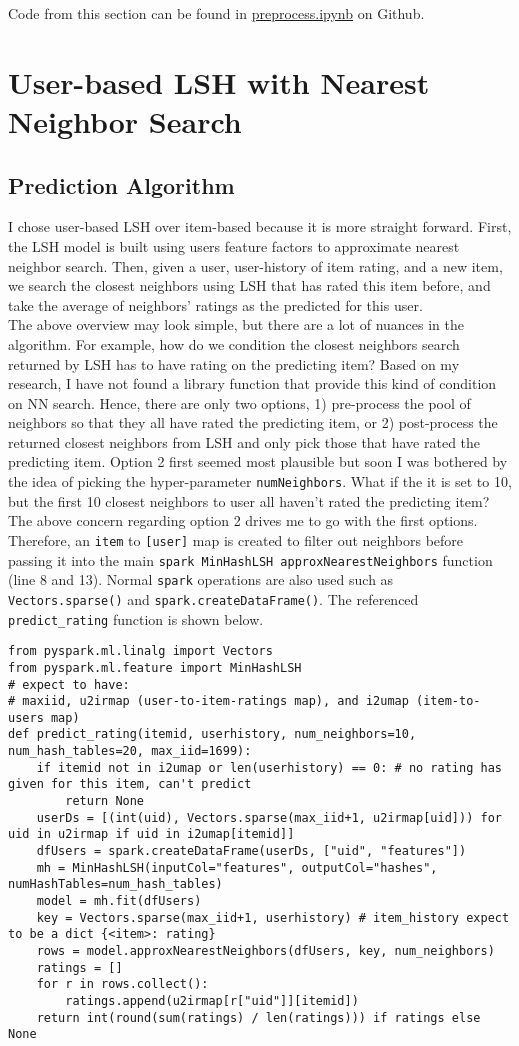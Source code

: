 \documentclass{scrartcl}
\begin{document}
Code from this section can be found in \href{pre}{preprocess.ipynb} on Github. \\
\section{User-based LSH with Nearest Neighbor Search}
\subsection{Prediction Algorithm}
I chose user-based LSH over item-based because it is more straight forward. First, the LSH model is built using users feature factors to approximate nearest neighbor search. Then, given a user, user-history of item rating, and a new item, we search the closest neighbors using LSH that has rated this item before, and take the average of neighbors' ratings as the predicted for this user. \\
The above overview may look simple, but there are a lot of nuances in the algorithm. For example,
how do we condition the closest neighbors search returned by LSH has to have rating on the predicting item? Based on my research, I have not found a library function that provide this kind of condition on NN search. Hence, there are only two options, 1) pre-process the pool of neighbors so that they all have rated the predicting item, or 2) post-process the returned closest neighbors from LSH and only pick those that have rated the predicting item. Option 2 first seemed most plausible but soon I was bothered by the idea of picking the hyper-parameter \texttt{numNeighbors}. What if the it is set to 10, but the first 10 closest neighbors to user all haven't rated the predicting item? \\
The above concern regarding option 2 drives me to go with the first options. Therefore, an \texttt{item} to \texttt{[user]} map is created to filter out neighbors before passing it into the main \texttt{spark MinHashLSH approxNearestNeighbors} function (line 8 and 13). Normal \texttt{spark} operations are also used such as \texttt{Vectors.sparse()} and \texttt{spark.createDataFrame()}. The referenced \texttt{predict\_rating} function is shown below.
\begin{lstlisting}
from pyspark.ml.linalg import Vectors
from pyspark.ml.feature import MinHashLSH
# expect to have:
# maxiid, u2irmap (user-to-item-ratings map), and i2umap (item-to-users map)
def predict_rating(itemid, userhistory, num_neighbors=10, num_hash_tables=20, max_iid=1699):
    if itemid not in i2umap or len(userhistory) == 0: # no rating has given for this item, can't predict
        return None
    userDs = [(int(uid), Vectors.sparse(max_iid+1, u2irmap[uid])) for uid in u2irmap if uid in i2umap[itemid]]
    dfUsers = spark.createDataFrame(userDs, ["uid", "features"])
    mh = MinHashLSH(inputCol="features", outputCol="hashes", numHashTables=num_hash_tables)
    model = mh.fit(dfUsers)
    key = Vectors.sparse(max_iid+1, userhistory) # item_history expect to be a dict {<item>: rating}
    rows = model.approxNearestNeighbors(dfUsers, key, num_neighbors)
    ratings = []
    for r in rows.collect():
        ratings.append(u2irmap[r["uid"]][itemid])
    return int(round(sum(ratings) / len(ratings))) if ratings else None
\end{lstlisting}
\end{document}
